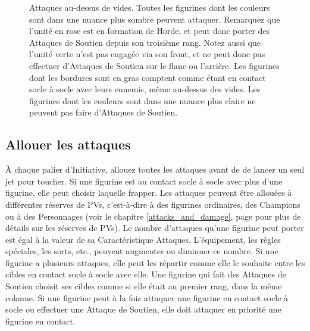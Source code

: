 \begin{figure}[!htbp]
\begin{minipage}{0.53\textwidth}
\def\svgwidth{\textwidth}

\end{minipage}\hfill\begin{minipage}{0.44\textwidth}
\caption{Attaques au-dessus de vides.\vspace*{10pt}\newline
Toutes les figurines dont les couleurs sont dans une nuance plus sombre peuvent attaquer. Remarquez que l'unité en rose est en formation de Horde, et peut donc porter des Attaques de Soutien depuis son troisième rang. Notez aussi que l'unité verte n'est pas engagée via son front, et ne peut donc pas effectuer d'Attaques de Soutien sur le flanc ou l'arrière.\vspace*{10pt}\newline
Les figurines dont les bordures sont en gras comptent comme étant en contact socle à socle avec leurs ennemis, même au-dessus des vides. Les figurines dont les couleurs sont dans une nuance plus claire ne peuvent pas faire d'Attaques de Soutien.}
\label{figure/empty_gaps}
\end{minipage}
\end{figure}

\clearpage
\subsection{Allouer les attaques}

À chaque palier d'Initiative, allouez toutes les attaques avant de de lancer un seul jet pour toucher. Si une figurine est au contact socle à socle avec plus d'une figurine, elle peut choisir laquelle frapper. Les attaques peuvent être allouées à différentes réserves de PVs, c'est-à-dire à des figurines ordinaires, des Champions ou à des Personnages (voir le chapitre \ref{attacks_and_damage}, page \pageref{attacks_and_damage} pour plus de détails sur les réserves de PVs). Le nombre d'attaques qu'une figurine peut porter est égal à la valeur de sa Caractéristique Attaques. L'équipement, les règles spéciales, les sorts, etc., peuvent augmenter ou diminuer ce nombre. Si une figurine a plusieurs attaques, elle peut les répartir comme elle le souhaite entre les cibles en contact socle à socle avec elle. Une figurine qui fait des Attaques de Soutien choisit ses cibles comme si elle était au premier rang, dans la même colonne. Si une figurine peut à la fois attaquer une figurine en contact socle à socle ou effectuer une Attaque de Soutien, elle doit attaquer en priorité une figurine en contact.


